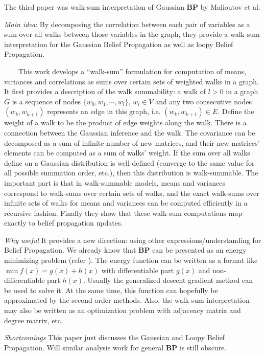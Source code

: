The third paper was walk-sum interpretation of Gaussian \textbf{BP} by Malioutov et al.
\cite{Malioutov2006}
\begin{itemize*}
\item {\em Main idea}:
By decomposing the correlation between each pair of variables as a sum over all walks between those variables in the graph, they provide a walk-sum interpretation for the Gaussian Belief Propagation as well as loopy Belief Propagation.

~~~~This work develops a ``walk-sum'' formulation for computation of means, variances and correlations as sums over certain sets of weighted walks in a graph. It first provides a description of the walk summability: a walk of $l>0$ in a graph $G$ is a sequence of nodes $\{w_0, w_1, \cdots, w_l\}$, $w_i\in V$ and any two consecutive nodes $(w_k, w_{k+1})$ represents an edge in this graph, i.e. $(w_k, w_{k+1})\in E$. Define the weight of a walk to be the product of edge weights along the walk. There is a connection between the Gaussian inference and the walk. The covariance can be decomposed as a sum of infinite number of new matrices, and their new matrices' elements can be computed as a sum of walks' weight. If the sum over all walks define on a Gaussian distribution is well defined (converge to the same value for all possible summation order, etc.), then this distribution is walk-summable. The important part is that in walk-summable models, means and variances correspond to walk-sums over certain sets of walks, and the exact walk-sums over infinite sets of walks for means and variances can be computed efficiently in a recursive fashion. Finally they show that these walk-sum computations map exactly to belief propagation updates.
\item {\em Why useful}
It provides a new direction: using other expressions/understanding for Belief Propagation. We already know that \textbf{BP} can be presented as an energy minimizing problem (refer \cite{And04efficientbelief}). The energy function can be written as a format like $\min f(x)=g(x)+h(x)$
with differentiable part $g(x)$ and non-differentiable part $h(x)$. Usually the generalized descent gradient method can be used to solve it. At the same time, this function can hopefully be approximated by the second-order methods. Also, the walk-sum interpretation may also be written as an optimization problem with adjacency matrix and degree matrix, etc.
\item{\em Shortcomings}
This paper just discusses the Gaussian and Loopy Belief Propagation. Will similar analysis work for general \textbf{BP} is still obscure.

\end{itemize*}

